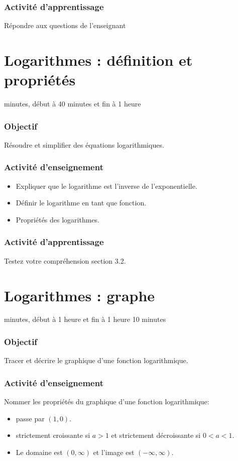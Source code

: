 \documentclass[12pt]{article}
\begin{document}
\subsubsection*{\faCalculator{} Activité d'apprentissage}
Répondre aux questions de l'enseignant


\clearpage
\section{Logarithmes : définition et propriétés}
 minutes, début à 40 minutes et fin à 1 heure
\subsubsection*{\faBullseye{} Objectif}
Résoudre et simplifier des équations logarithmiques.
\subsubsection*{\faChalkboardTeacher{} Activité d'enseignement}
\begin{itemize}
    \item Expliquer que le logarithme est l'inverse de l'exponentielle.
    \item Définir le logarithme en tant que fonction.
    \item Propriétés des logarithmes.
\end{itemize}
\subsubsection*{\faCalculator{} Activité d'apprentissage}
Testez votre compréhension section 3.2.


\clearpage
\section{Logarithmes : graphe}
 minutes, début à 1 heure et fin à 1 heure 10 minutes
\subsubsection*{\faBullseye{} Objectif}
Tracer et décrire le graphique d'une fonction logarithmique.
\subsubsection*{\faChalkboardTeacher{} Activité d'enseignement}
Nommer les propriétés du graphique d'une fonction logarithmique:
\begin{itemize}
\item passe par $(1,0)$.
\item strictement croissante si $a > 1$ et strictement décroissante si $0 < a < 1$.
\item Le domaine est $(0, \infty)$ et l'image est $(-\infty, \infty)$.
\end{itemize}
\end{document}
